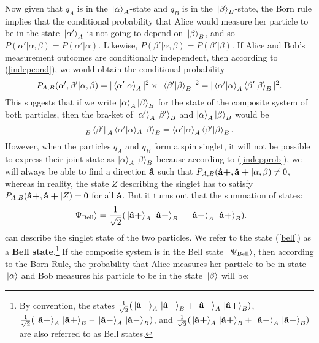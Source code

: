 Now given that $q_A$ is in the $\ket*{\alpha}_A$-state and $q_B$ is in the $\ket*{\beta}_B$-state, the Born rule implies that the conditional probability that Alice would measure her particle to be in the state $\ket*{\alpha'}_A$ is not going to depend on $\ket*{\beta}_B$,  and so  $P(\alpha'|\alpha,\beta)=P(\alpha'|\alpha)$. Likewise, $P(\beta'|\alpha,\beta)=P(\beta'|\beta)$. 
If Alice and Bob's measurement outcomes are conditionally independent, then according to (\ref{indepcond}), we would obtain the conditional probability
\begin{equation}\label{indepprob}
    P_{A,B}(\alpha',\beta'|\alpha,\beta)=|\ip{\alpha'}{\alpha}_A|^2\times|\ip{\beta'}{\beta}_B|^2=|\ip{\alpha'}{\alpha}_A\ip{\beta'}{\beta}_B|^2.
\end{equation}
This suggests that if we write $\ket{\alpha}_A\ket{\beta}_B$ for the state of the composite system of both particles, then the bra-ket of $\ket{\alpha'}_A\ket{\beta'}_B$ and $\ket{\alpha}_A\ket{\beta}_B$ 
would be
\begin{equation}\label{innerprod}
    \prescript{}{B}{ \bra*{\beta'}}\prescript{}{A}{\ip*{\alpha'}{\alpha}}_A\ket*{\beta}_B=\ip{\alpha'}{\alpha}_A\ip{\beta'}{\beta}_B.
\end{equation}
However, when the particles $q_A$ and $q_B$ form a spin singlet, it will not be possible to express their joint state as $\ket{\alpha}_A\ket{\beta}_B$ because according to (\ref{indepprob}), we will always be able to find a direction $\vb{\hat{{a}}}$ such that $P_{A,B}(\vb{\hat{{a}}}\bm{+},\vb{\hat{{a}}}\bm{+}|\alpha,\beta)\neq 0$, whereas in reality, the state $Z$ describing the singlet has to satisfy $P_{A,B}(\vb{\hat{{a}}}\bm{+},\vb{\hat{{a}}}\bm{+}|Z)=0$ for all  $\vb{\hat{{a}}}$.
But it turns out that the summation of states:
\begin{equation}\label{bell}
    \ket*{\Psi_{\text{Bell}}}=\frac{1}{\sqrt{2}}(\ket*{\vb{\hat{{a}}}\bm{+}}_A\ket*{\vb{\hat{{a}}}\bm{-}}_B-\ket*{\vb{\hat{{a}}}\bm{-}}_A\ket*{\vb{\hat{{a}}}\bm{+}}_B).
\end{equation}
can describe the singlet state of the two particles. We refer to the state (\ref{bell}) as a \textbf{Bell state}.\footnote{By convention, the states $ \frac{1}{\sqrt{2}}(\ket*{\vb{\hat{{a}}}\bm{+}}_A\ket*{\vb{\hat{{a}}}\bm{-}}_B+\ket*{\vb{\hat{{a}}}\bm{-}}_A\ket*{\vb{\hat{{a}}}\bm{+}}_B)$, $ \frac{1}{\sqrt{2}}(\ket*{\vb{\hat{{a}}}\bm{+}}_A\ket*{\vb{\hat{{a}}}\bm{+}}_B-\ket*{\vb{\hat{{a}}}\bm{-}}_A\ket*{\vb{\hat{{a}}}\bm{-}}_B)$, and $ \frac{1}{\sqrt{2}}(\ket*{\vb{\hat{{a}}}\bm{+}}_A\ket*{\vb{\hat{{a}}}\bm{+}}_B+\ket*{\vb{\hat{{a}}}\bm{-}}_A\ket*{\vb{\hat{{a}}}\bm{-}}_B)$ are also referred to as Bell states.} If the composite system is in the Bell state $\ket*{\Psi_{\text{Bell}}}$, then according to the Born Rule, the probability that Alice measures her particle to be in state $\ket*{\alpha}$ and Bob measures his particle to be in the state $\ket*{\beta}$ will be:
